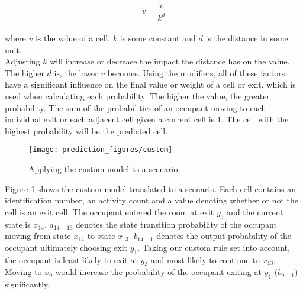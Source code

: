 \begin{equation}
v = \frac{v}{k^d}
\end{equation}
\\
where \(v\) is the value of a cell, \(k\) is some constant and \(d\) is the distance in some unit. \\
Adjusting \(k\) will increase or decrease the impact the distance has on the value. The higher \(d\) is, the lower \(v\) becomes. Using the modifiers, all of these factors have a significant influence on the final value or weight of a cell or exit, which is used when calculating each probability. The higher the value, the greater probability. The sum of the probabilities of an occupant moving to each individual exit or each adjacent cell given a current cell is 1. The cell with the highest probability will be the predicted cell.
\begin{figure}[htb]
\centering
\texttt{[image: prediction\_figures/custom]}
\caption{Applying the custom model to a scenario.}
\label{fig:custom_model}
\end{figure}

Figure \ref{fig:custom_model} shows the custom model translated to a scenario. Each cell contains an identification number, an activity count and a value denoting whether or not the cell is an exit cell. The occupant entered the room at exit \(y_3\) and the current state is \(x_{14}\). \(a_{14-13}\) denotes the state transition probability of the occupant moving from state \(x_{14}\) to state \(x_{13}\). \(b_{14-1}\) denotes the output probability of the occupant ultimately choosing exit \(y_{1}\). Taking our custom rule set into account, the occupant is least likely to exit at \(y_3\) and most likely to continue to \(x_{13}\). Moving to \(x_9\) would increase the probability of the occupant exiting at \(y_{1}\) (\(b_{9-1}\)) significantly.
